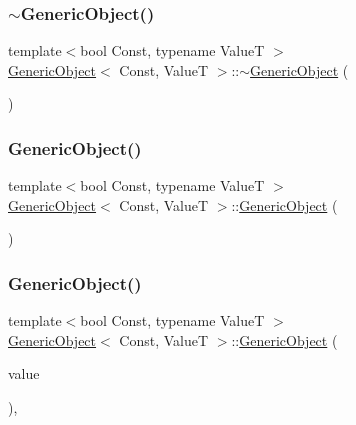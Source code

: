 \mbox{\label{classGenericObject_a8ac79abb76ac4d2c647681a37fc4ab46}} 
\subsubsection{\texorpdfstring{$\sim$\+Generic\+Object()}{~GenericObject()}}
{\footnotesize\ttfamily template$<$bool Const, typename ValueT $>$ \\
\hyperlink{classGenericObject}{Generic\+Object}$<$ Const, ValueT $>$\+::$\sim$\hyperlink{classGenericObject}{Generic\+Object} (\begin{DoxyParamCaption}{ }\end{DoxyParamCaption})\hspace{0.3cm}{\ttfamily [inline]}}

\mbox{\label{classGenericObject_a4bd854dbe7168cf81541fad6fd9d9f12}} 
\subsubsection{\texorpdfstring{Generic\+Object()}{GenericObject()}\hspace{0.1cm}{\footnotesize\ttfamily [2/3]}}
{\footnotesize\ttfamily template$<$bool Const, typename ValueT $>$ \\
\hyperlink{classGenericObject}{Generic\+Object}$<$ Const, ValueT $>$\+::\hyperlink{classGenericObject}{Generic\+Object} (\begin{DoxyParamCaption}{ }\end{DoxyParamCaption})\hspace{0.3cm}{\ttfamily [private]}}

\mbox{\label{classGenericObject_a56600535a7936f35f53973e358cd4731}} 
\subsubsection{\texorpdfstring{Generic\+Object()}{GenericObject()}\hspace{0.1cm}{\footnotesize\ttfamily [3/3]}}
{\footnotesize\ttfamily template$<$bool Const, typename ValueT $>$ \\
\hyperlink{classGenericObject}{Generic\+Object}$<$ Const, ValueT $>$\+::\hyperlink{classGenericObject}{Generic\+Object} (\begin{DoxyParamCaption}\item[{\hyperlink{classGenericObject_a930aa30f89caee7ba7bff60bf9dc21b1}{Value\+Type} \&}]{value }\end{DoxyParamCaption})\hspace{0.3cm}{\ttfamily [inline]}, {\ttfamily [private]}}



